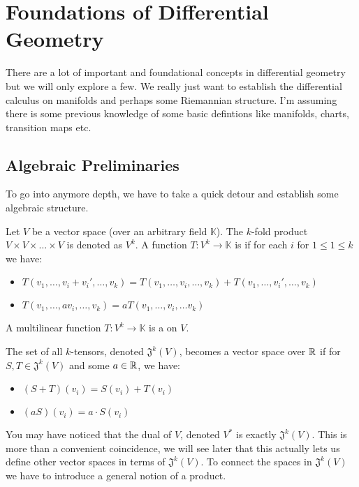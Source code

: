 \section{Foundations of Differential Geometry}
There are a lot of important and foundational concepts in differential geometry
but we will only explore a few. We really just want to establish the differential
calculus on manifolds and perhaps some Riemannian structure. I'm assuming there
is some previous knowledge of some basic defintions like manifolds, charts, transition
maps etc.

\subsection{Algebraic Preliminaries}
To go into anymore depth, we have to take a quick detour and establish some algebraic
structure.

\begin{definition}
    Let $V$ be a vector space (over an arbitrary field $\mathbb{K}$). The $k$-fold
    product $V \times V \times \hdots \times V$ is denoted as $V^k$. A function
    $T: V^k \to \mathbb{K}$ is  if for each $i$ for $1 \leq 1 \leq k$
    we have:
    \begin{itemize}
        \item $T(v_1, \hdots, v_i + v_i', \hdots, v_k) = T(v_1, \hdots, v_i, \hdots, v_k)
        + T(v_1, \hdots, v_i', \hdots, v_k)$ 
        \item $T(v_1, \hdots, av_i, \hdots, v_k) = aT(v_1, \hdots, v_i, \hdots v_k)$
    \end{itemize}
    A multilinear function $T: V^k \to \mathbb{K}$ is a  on $V$.
\end{definition}

The set of all $k$-tensors, denoted $\mathfrak{J}^k(V)$, becomes a vector space
over $\mathbb{R}$ if for $S,T \in \mathfrak{J}^k(V)$ and some $a \in \mathbb{R}$, we have:
\begin{itemize}
    \item $(S+T)(v_i) = S(v_i) + T(v_i)$
    \item $(aS)(v_i) = a \cdot S(v_i)$
\end{itemize}

You may have noticed that the dual of $V$, denoted $V^*$ is exactly $\mathfrak{J}^k(V)$.
This is more than a convenient coincidence, we will see later that this actually
lets us define other vector spaces in terms of $\mathfrak{J}^k(V)$. To connect the
spaces in $\mathfrak{J}^k(V)$ we have to introduce a general notion of a product.

